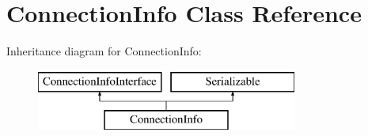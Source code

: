 \hypertarget{class_pes_1_1_database_1_1_handler_1_1_connection_info}{}\section{Connection\+Info Class Reference}
\label{class_pes_1_1_database_1_1_handler_1_1_connection_info}
Inheritance diagram for Connection\+Info\+:\begin{figure}[H]
\begin{center}
\leavevmode
\includegraphics[height=2.000000cm]{class_pes_1_1_database_1_1_handler_1_1_connection_info}
\end{center}
\end{figure}
